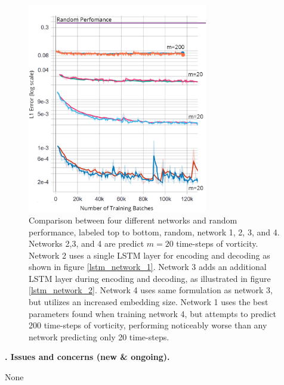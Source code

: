 \documentclass[12pt]{article}
\newcounter{DarpaSecCounter}
\renewcommand{\section}[1]{\stepcounter{DarpaSecCounter}\vspace{15pt}\noindent\textbf{{\theDarpaSecCounter.} #1}\vspace{3pt}}
\theoremstyle{plain}
\theoremstyle{remark}
\theoremstyle{definition}
\begin{document}
\begin{figure}
	\begin{center}
		\includegraphics[width=0.7\textwidth]{images/acc_lstm.PNG}
		\caption{\small Comparison between four different networks and random performance, labeled top to bottom, random, network 1, 2, 3, and 4. Networks 2,3, and 4 are predict $m=20$ time-steps of vorticity. Network 2 uses a single LSTM layer for encoding and decoding as shown in figure \ref{lstm_network_1}. Network 3 adds an additional LSTM layer during encoding and decoding, as illustrated in figure \ref{lstm_network_2}. Network 4 uses same formulation as network 3, but utilizes an increased embedding size. Network 1 uses the best parameters found when training network 4, but attempts to predict 200 time-steps of vorticity, performing noticeably worse than any network predicting only 20 time-steps.}
		\label{performance}
	\end{center}	
\end{figure}







\section{Issues and concerns (new \& ongoing).}

None






%
%
\end{document}
